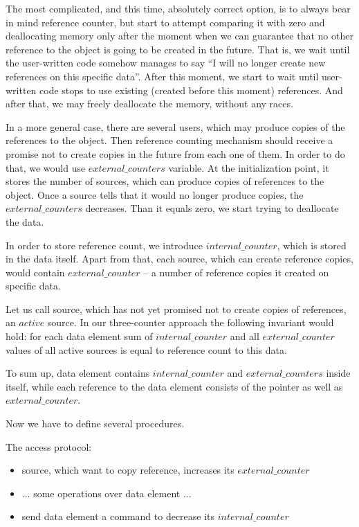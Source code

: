 \documentclass{article}
\begin{document}
The most complicated, and this time, absolutely correct option, is to always bear in mind reference counter, but start to attempt comparing it with zero and deallocating memory only after the moment when we can guarantee that no other reference to the object is going to be created in the future. That is, we wait until the user-written code somehow manages to say ``I will no longer create new references on this specific data''. After this moment, we start to wait until user-written code stops to use existing (created before this moment) references. And after that, we may freely deallocate the memory, without any races.

In a more general case, there are several users, which may produce copies of the references to the object. Then reference counting mechanism should receive a promise not to create copies in the future from each one of them. In order to do that, we would use $external\_counters$ variable. At the initialization point, it stores the number of sources, which can produce copies of references to the object. Once a source tells that it would no longer produce copies, the $external\_counters$ decreases. Than it equals zero, we start trying to deallocate the data.

In order to store reference count, we introduce $internal\_counter$, which is stored in the data itself. Apart from that, each source, which can create reference copies, would contain $external\_counter$ -- a number of reference copies it created on specific data.

Let us call source, which has not yet promised not to create copies of references, an $active$ source. In our three-counter approach the following invariant would hold: for each data element sum of  $internal\_counter$ and all $external\_counter$ values of all active sources is equal to reference count to this data.

To sum up, data element contains $internal\_counter$ and $external\_counters$ inside itself, while each reference to the data element consists of the pointer as well as $external\_counter$.

Now we have to define several procedures.

The access protocol:
\begin{itemize}
	\item source, which want to copy reference, increases its $external\_counter$
	\item ... some operations over data element ...
	\item send data element a command to decrease its $internal\_counter$
\end{itemize}
\end{document}
